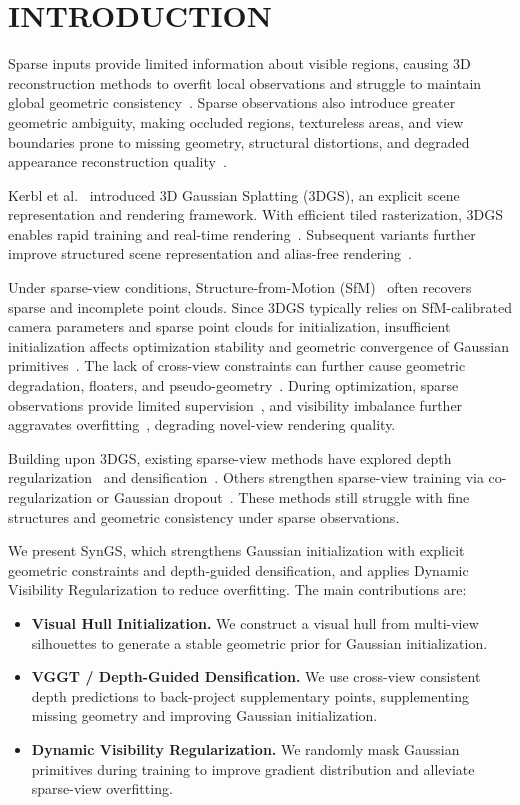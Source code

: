 \section{INTRODUCTION}
\label{sec:intro}

Sparse inputs provide limited information about visible regions, causing 3D reconstruction methods to overfit local observations and struggle to maintain global geometric consistency~\cite{Yang23_FreeNeRF}. Sparse observations also introduce greater geometric ambiguity, making occluded regions, textureless areas, and view boundaries prone to missing geometry, structural distortions, and degraded appearance reconstruction quality~\cite{Niemeyer22_RegNeRF}.

Kerbl et al.~\cite{Kerbl23_3DGS} introduced 3D Gaussian Splatting (3DGS), an explicit scene representation and rendering framework. With efficient tiled rasterization, 3DGS enables rapid training and real-time rendering~\cite{Kerbl23_3DGS}. Subsequent variants further improve structured scene representation and alias-free rendering~\cite{Lu24_ScaffoldGS,Yu24_MipSplatting}.

Under sparse-view conditions, Structure-from-Motion (SfM)~\cite{Schonberger16_COLMAP} often recovers sparse and incomplete point clouds. Since 3DGS typically relies on SfM-calibrated camera parameters and sparse point clouds for initialization, insufficient initialization affects optimization stability and geometric convergence of Gaussian primitives~\cite{Chung24_DepthRegGS}. The lack of cross-view constraints can further cause geometric degradation, floaters, and pseudo-geometry~\cite{Xu25_DropoutGS}. During optimization, sparse observations provide limited supervision~\cite{Park25_DropGaussian}, and visibility imbalance further aggravates overfitting~\cite{Somraj23_ViPNeRF}, degrading novel-view rendering quality.

Building upon 3DGS, existing sparse-view methods have explored depth regularization~\cite{Li24_DNGaussian} and densification~\cite{Zhu24_FSGS}. Others strengthen sparse-view training via co-regularization or Gaussian dropout~\cite{Zhang24_CoRGS,Park25_DropGaussian}. These methods still struggle with fine structures and geometric consistency under sparse observations.

We present SynGS, which strengthens Gaussian initialization with explicit geometric constraints and depth-guided densification, and applies Dynamic Visibility Regularization to reduce overfitting. The main contributions are:
\begin{itemize}
\item \textbf{Visual Hull Initialization.} We construct a visual hull from multi-view silhouettes to generate a stable geometric prior for Gaussian initialization.
\item \textbf{VGGT / Depth-Guided Densification.} We use cross-view consistent depth predictions to back-project supplementary points, supplementing missing geometry and improving Gaussian initialization.
\item \textbf{Dynamic Visibility Regularization.} We randomly mask Gaussian primitives during training to improve gradient distribution and alleviate sparse-view overfitting.
\end{itemize}
